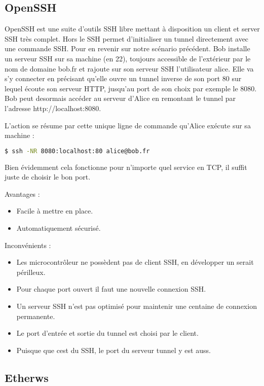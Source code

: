 \subsection{OpenSSH}

OpenSSH est une suite d'outils SSH libre mettant à disposition un client et server SSH très complet. Hors le SSH permet d'initialiser un tunnel directement avec une commande SSH. Pour en revenir sur notre scénario précédent. Bob installe un serveur SSH sur sa machine (en 22), toujours accessible de l'extérieur par le nom de domaine bob.fr et rajoute sur son serveur SSH l'utilisateur alice. Elle va s'y connecter en précisant qu'elle ouvre un tunnel inverse de son port 80 sur lequel écoute son serveur HTTP, jusqu'au port de son choix par exemple le 8080. Bob peut desormais accéder au serveur d'Alice en remontant le tunnel par l'adresse http://localhost:8080.

\noindent L'action se résume par cette unique ligne de commande qu'Alice exécute sur sa machine :
\begin{lstlisting}[language=bash]
  $ ssh -NR 8080:localhost:80 alice@bob.fr
\end{lstlisting}

Bien évidemment cela fonctionne pour n'importe quel service en TCP, il suffit juste de choisir le bon port.

Avantages :
\begin{itemize}
    \item Facile à mettre en place.
    \item Automatiquement sécurisé.
\end{itemize}

Inconvénients :
\begin{itemize}
    \item Les microcontrôleur ne possèdent pas de client SSH, en développer un serait périlleux.
    \item Pour chaque port ouvert il faut une nouvelle connexion SSH.
    \item Un serveur SSH n'est pas optimisé pour maintenir une centaine de connexion permanente.
    \item Le port d'entrée et sortie du tunnel est choisi par le client.
    \item Puisque que cest du SSH, le port du serveur tunnel y est auss.
\end{itemize}

\subsection{Etherws}

